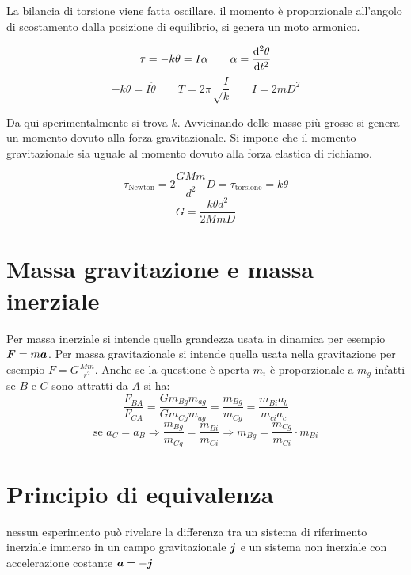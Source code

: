 La bilancia di torsione viene fatta oscillare, il momento è
proporzionale all'angolo di scostamento dalla posizione di
equilibrio, si genera un moto armonico.

\begin{equation*}\tau=-k\theta=I\alpha\qquad\alpha=\frac{\mathrm{d}^2\theta}{\mathrm{d} t^2}\end{equation*}
\begin{equation*}-k\theta=I\ddot\theta\qquad T=2\pi\sqrt\frac{I}{k}\qquad I=2mD^2\end{equation*}


Da qui sperimentalmente si trova $k$. Avvicinando delle masse più
grosse si genera un momento dovuto alla forza gravitazionale. Si
impone che il momento gravitazionale sia uguale al momento dovuto
alla forza elastica di richiamo.

\begin{equation*}\tau_\text{Newton}=2\frac{GMm}{d^2}D=\tau_\text{torsione}=k\theta\end{equation*}
\begin{equation*}G=\frac{k\theta d^2}{2MmD}\end{equation*}
\section{Massa gravitazione e massa inerziale}
Per massa inerziale si intende quella grandezza usata in dinamica
per esempio \mbox{$\boldsymbol{F}=m\boldsymbol{a}$}. Per massa gravitazionale si intende quella usata nella gravitazione per esempio $F=G\frac{Mm}{r^2}$. Anche se la questione è aperta $m_i$ è proporzionale a $m_g$ infatti se $B$ e $C$ sono attratti da $A$ si ha:
\begin{equation*}\frac{F_{BA}}{F_{CA}}=\frac{Gm_{Bg}m_{ag}}{Gm_{Cg}m_{ag}}=\frac{m_{Bg}}{m_{Cg}}=\frac{m_{Bi}a_b}{m_{ci}a_c}\end{equation*}
$$\text{se }a_C=a_B\Rightarrow\frac{m_{Bg}}{m_{Cg}}=\frac{m_{Bi}}{m_{Ci}}\Rightarrow
m_{Bg}=\frac{m_{Cg}}{m_{Ci}}\cdot m_{Bi}$$
\section{Principio di equivalenza}
\begin{Pri}
nessun esperimento può rivelare la differenza tra un sistema di riferimento inerziale immerso in un campo gravitazionale $\boldsymbol{j}$ e un sistema non inerziale con accelerazione costante $\boldsymbol{a}=-\boldsymbol{j}$
\end{Pri}
